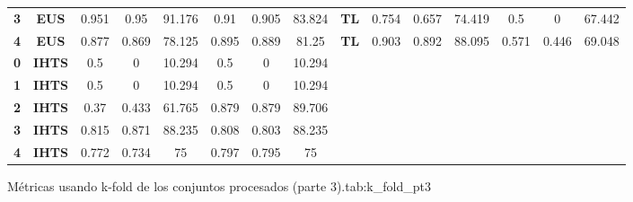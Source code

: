 {{\begin{tabular}{c|c|cccccc|ccccccc}
\textbf{3} & \textbf{EUS} & 0.951 & 0.95  & 91.176 & 0.91  & 0.905 & 83.824 & \multicolumn{1}{c|}{\textbf{TL}} & 0.754 & 0.657 & 74.419 & 0.5   & 0     & 67.442 \\
\textbf{4} & \textbf{EUS} & 0.877 & 0.869 & 78.125 & 0.895 & 0.889 & 81.25 & \multicolumn{1}{c|}{\textbf{TL}} & 0.903 & 0.892 & 88.095 & 0.571 & 0.446 & 69.048 \\
\textbf{0} & \textbf{IHTS} & 0.5   & 0     & 10.294 & 0.5   & 0     & 10.294 &       &       &       &       &       &       &  \\
\textbf{1} & \textbf{IHTS} & 0.5   & 0     & 10.294 & 0.5   & 0     & 10.294 &       &       &       &       &       &       &  \\
\textbf{2} & \textbf{IHTS} & 0.37  & 0.433 & 61.765 & 0.879 & 0.879 & 89.706 &       &       &       &       &       &       &  \\
\textbf{3} & \textbf{IHTS} & 0.815 & 0.871 & 88.235 & 0.808 & 0.803 & 88.235 &       &       &       &       &       &       &  \\
\textbf{4} & \textbf{IHTS} & 0.772 & 0.734 & 75    & 0.797 & 0.795 & 75    &       &       &       &       &       &       &  \\
\end{tabular}}}{Métricas usando k-fold de los conjuntos procesados (parte 3).}{tab:k_fold_pt3}

